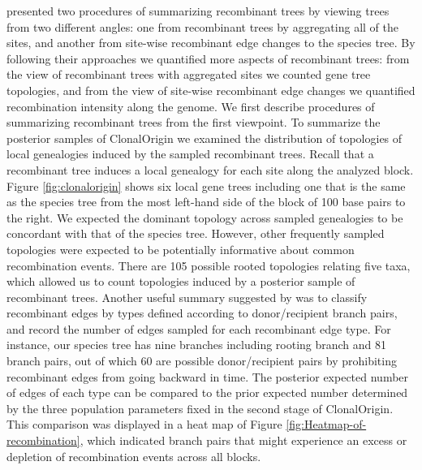 \documentclass[english]{article}
\begin{document}
\citet{Didelot2010} presented two procedures of summarizing recombinant trees by
viewing trees from two different angles: one from recombinant trees by
aggregating all of the sites, and another from site-wise recombinant edge
changes to the species tree. By following their approaches
we quantified more aspects of recombinant trees: from the view of recombinant
trees with aggregated sites we counted gene tree topologies, and from the view of
site-wise recombinant edge changes we quantified recombination intensity along
the genome. 
We first describe procedures of summarizing recombinant trees from
the first viewpoint.
To summarize the posterior samples of ClonalOrigin we examined
the distribution of topologies of local genealogies induced by the sampled 
recombinant trees. Recall that a recombinant tree induces a local genealogy for 
each site along the analyzed block. Figure \ref{fig:clonalorigin} shows six
local gene trees including one that is the same as the species tree from the
most left-hand side of the block of 100 base pairs to the right.
We expected the dominant topology across 
sampled genealogies to be concordant with that of the species tree. However, 
other frequently sampled topologies were expected to be potentially informative about 
common recombination events. There are 105 possible 
rooted topologies relating five taxa, which allowed us to count topologies
induced by a posterior sample of recombinant trees.
Another useful summary suggested by 
\citet{Didelot2010} was to classify recombinant edges by types defined according 
to donor/recipient branch pairs, and record the number of edges sampled for
each recombinant edge type. For instance, our species tree has nine branches
including rooting branch and 
81 branch pairs, out of which 60 are possible donor/recipient pairs 
by prohibiting recombinant edges from going backward in time. The posterior 
expected number of edges of each type can be compared to the prior expected 
number determined by the three population parameters fixed in the second stage of 
ClonalOrigin. This comparison was displayed in a heat map of 
Figure \ref{fig:Heatmap-of-recombination}, which indicated branch pairs that 
might experience an excess or depletion of recombination events across all
blocks.
\end{document}
